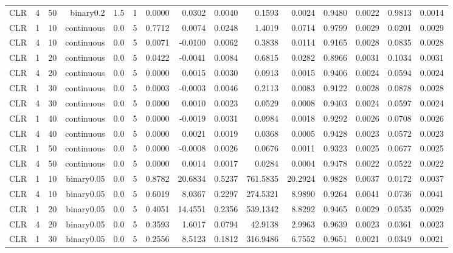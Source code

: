 \begin{longtable}{rrrrrrrrrrrrrrr}
  CLR & 4 & 50 & binary0.2 & 1.5 & 1 & 0.0000 & 0.0302 & 0.0040 & 0.1593 & 0.0024 & 0.9480 & 0.0022 & 0.9813 & 0.0014 \\ 
  CLR & 1 & 10 & continuous & 0.0 & 5 & 0.7712 & 0.0074 & 0.0248 & 1.4019 & 0.0714 & 0.9799 & 0.0029 & 0.0201 & 0.0029 \\ 
  CLR & 4 & 10 & continuous & 0.0 & 5 & 0.0071 & -0.0100 & 0.0062 & 0.3838 & 0.0114 & 0.9165 & 0.0028 & 0.0835 & 0.0028 \\ 
  CLR & 1 & 20 & continuous & 0.0 & 5 & 0.0422 & -0.0041 & 0.0084 & 0.6815 & 0.0282 & 0.8966 & 0.0031 & 0.1034 & 0.0031 \\ 
  CLR & 4 & 20 & continuous & 0.0 & 5 & 0.0000 & 0.0015 & 0.0030 & 0.0913 & 0.0015 & 0.9406 & 0.0024 & 0.0594 & 0.0024 \\ 
  CLR & 1 & 30 & continuous & 0.0 & 5 & 0.0003 & -0.0003 & 0.0046 & 0.2113 & 0.0083 & 0.9122 & 0.0028 & 0.0878 & 0.0028 \\ 
  CLR & 4 & 30 & continuous & 0.0 & 5 & 0.0000 & 0.0010 & 0.0023 & 0.0529 & 0.0008 & 0.9403 & 0.0024 & 0.0597 & 0.0024 \\ 
  CLR & 1 & 40 & continuous & 0.0 & 5 & 0.0000 & -0.0019 & 0.0031 & 0.0984 & 0.0018 & 0.9292 & 0.0026 & 0.0708 & 0.0026 \\ 
  CLR & 4 & 40 & continuous & 0.0 & 5 & 0.0000 & 0.0021 & 0.0019 & 0.0368 & 0.0005 & 0.9428 & 0.0023 & 0.0572 & 0.0023 \\ 
  CLR & 1 & 50 & continuous & 0.0 & 5 & 0.0000 & -0.0008 & 0.0026 & 0.0676 & 0.0011 & 0.9323 & 0.0025 & 0.0677 & 0.0025 \\ 
  CLR & 4 & 50 & continuous & 0.0 & 5 & 0.0000 & 0.0014 & 0.0017 & 0.0284 & 0.0004 & 0.9478 & 0.0022 & 0.0522 & 0.0022 \\ 
  CLR & 1 & 10 & binary0.05 & 0.0 & 5 & 0.8782 & 20.6834 & 0.5237 & 761.5835 & 20.2924 & 0.9828 & 0.0037 & 0.0172 & 0.0037 \\ 
  CLR & 4 & 10 & binary0.05 & 0.0 & 5 & 0.6019 & 8.0367 & 0.2297 & 274.5321 & 8.9890 & 0.9264 & 0.0041 & 0.0736 & 0.0041 \\ 
  CLR & 1 & 20 & binary0.05 & 0.0 & 5 & 0.4051 & 14.4551 & 0.2356 & 539.1342 & 8.8292 & 0.9465 & 0.0029 & 0.0535 & 0.0029 \\ 
  CLR & 4 & 20 & binary0.05 & 0.0 & 5 & 0.3593 & 1.6017 & 0.0794 & 42.9138 & 2.9963 & 0.9639 & 0.0023 & 0.0361 & 0.0023 \\ 
  CLR & 1 & 30 & binary0.05 & 0.0 & 5 & 0.2556 & 8.5123 & 0.1812 & 316.9486 & 6.7552 & 0.9651 & 0.0021 & 0.0349 & 0.0021 \\ 

\end{longtable}
